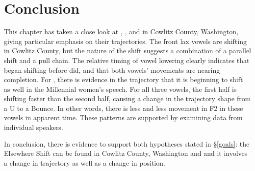 \section{Conclusion}
\label{bat_bet_bit_conclusion}

This chapter has taken a close look at \bat, \bet, and \bit in Cowlitz County, Washington, giving particular emphasis on their trajectories. The front lax vowels are shifting in Cowlitz County, but the nature of the shift suggests a combination of a parallel shift and a pull chain. The relative timing of vowel lowering clearly indicates that \bat began shifting before \bet did, and that both vowels' movements are nearing completion. For \bit, there is evidence in the trajectory that it is beginning to shift as well in the Millennial women's speech. For all three vowels, the first half is shifting faster than the second half, causing a change in the trajectory shape from a U to a Bounce. In other words, there is less and less movement in F2 in these vowels in apparent time. These patterns are supported by examining data from individual speakers.

In conclusion, there is evidence to support both hypotheses stated in \S\ref{goals}: the Elsewhere Shift can be found in Cowlitz County, Washington and and it involves a change in trajectory as well as a change in position.
